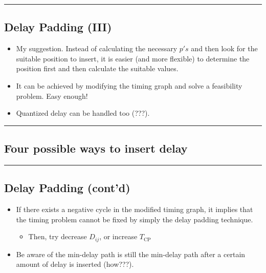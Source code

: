 \documentclass[
]{article}
\providecommand{\tightlist}{%
  \setlength{\itemsep}{0pt}\setlength{\parskip}{0pt}}
\begin{document}
\begin{center}\rule{0.5\linewidth}{0.5pt}\end{center}

\subsection{Delay Padding (III)}\label{delay-padding-iii}

\begin{itemize}
\tightlist
\item
  My suggestion. Instead of calculating the necessary \(p's\) and then
  look for the suitable position to insert, it is easier (and more
  flexible) to determine the position first and then calculate the
  suitable values.
\item
  It can be achieved by modifying the timing graph and solve a
  feasibility problem. Easy enough!
\item
  Quantized delay can be handled too (???).
\end{itemize}

\begin{center}\rule{0.5\linewidth}{0.5pt}\end{center}

\subsection{Four possible ways to insert delay}\label{four-possible-ways-to-insert-delay}

\begin{figure}[htpb]
\centering
{}
\subfigure[$p_s$, $p_h$ independently]{

}
\subfigure[$p_s = p_h$]{

}
\subfigure[$p_s \geq p_h$]{

}
\caption{}
\end{figure}

\begin{center}\rule{0.5\linewidth}{0.5pt}\end{center}

\subsection{Delay Padding (cont'd)}\label{delay-padding-contd}

\begin{itemize}
\tightlist
\item
  If there exists a negative cycle in the modified timing graph, it
  implies that the timing problem cannot be fixed by simply the delay
  padding technique.

  \begin{itemize}
  \tightlist
  \item
    Then, try decrease \(D_{ij}\), or increase \(T_\text{CP}\)
  \end{itemize}
\item
  Be aware of the min-delay path is still the min-delay path after a
  certain amount of delay is inserted (how???).
\end{itemize}
\end{document}
